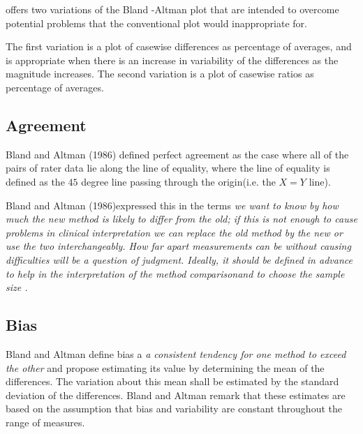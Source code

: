 \documentclass[12pt, a4paper]{report}
\theoremstyle{plain}
\theoremstyle{definition}
\theoremstyle{remark}
\begin{document}
	\citet{BA99} offers two variations of the Bland -Altman plot that
	are intended to overcome potential problems that the conventional
	plot would inappropriate for.
	
	The first variation is a plot of casewise differences as
	percentage of averages, and is appropriate when there is an
	increase in variability of the differences as the magnitude
	increases. The second variation is a plot of casewise ratios as
	percentage of averages.
	
	
	
	
	
	
	
	\subsection{Agreement} Bland and Altman (1986) defined perfect
	agreement as the case where all of the pairs of rater data lie
	along the line of equality, where the line of equality is defined
	as the $45$ degree line passing through the origin(i.e. the $X=Y$
	line).
	
	Bland and Altman (1986)expressed this in the terms \emph{we want
		to know by how much the new method is likely to differ from the
		old; if this is not enough to cause problems in clinical
		interpretation we can replace the old method by the new or use the
		two interchangeably. How far apart measurements can be without
		causing difficulties will be a question of judgment. Ideally, it
		should be defined in advance to help in the interpretation of the
		method comparisonand to choose the sample size .}
	\subsection{Bias}
	Bland and Altman define bias a \emph{a consistent tendency for one
		method to exceed the other} and propose estimating its value
	by determining the mean of the differences. The variation about
	this mean shall be estimated by the  standard deviation of the
	differences. Bland and Altman remark that these estimates are based on the
	assumption that bias and variability are constant throughout the
	range of measures.
\end{document}
